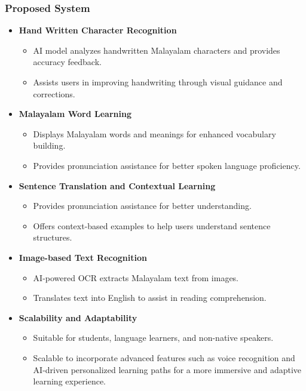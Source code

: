 \documentclass[aspectratio=169]{beamer}
\begin{document}
\begin{frame}
    \frametitle{Proposed System}
    \begin{itemize}
      \item \textbf{Hand Written Character Recognition}  
        \begin{itemize}
            \item AI model analyzes handwritten Malayalam characters and provides accuracy feedback.
            \item Assists users in improving handwriting through visual guidance and corrections.
        \end{itemize}

        \item \textbf{Malayalam Word Learning }
        \begin{itemize}
            \item Displays Malayalam words and meanings for enhanced vocabulary building.
            \item Provides pronunciation assistance for better spoken language proficiency.
        \end{itemize}

        \item \textbf{Sentence Translation and Contextual Learning}  
        \begin{itemize}
            \item Provides pronunciation assistance for better understanding.
            \item Offers context-based examples to help users understand sentence structures.
        \end{itemize}
        \item \textbf{Image-based Text Recognition}  
        \begin{itemize}
            \item AI-powered OCR extracts Malayalam text from images.
            \item Translates text into English to assist in reading comprehension.
        \end{itemize}
        \item \textbf{Scalability and Adaptability}  
        \begin{itemize}
            \item Suitable for students, language learners, and non-native speakers.
            \item Scalable to incorporate advanced features such as voice recognition and AI-driven personalized learning paths for a more immersive and adaptive learning experience.
        \end{itemize}
        
            
    \end{itemize}
\end{frame}
\end{document}
